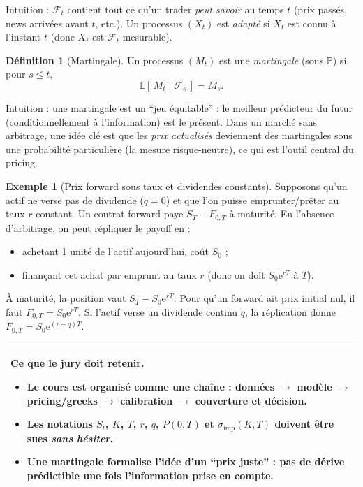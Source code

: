 \documentclass[11pt,a4paper]{report}
\newcommand{\ee}{\mathrm{e}}
\newcommand{\E}{\mathbb{E}}
\newcommand{\Prob}{\mathbb{P}}
\newcommand{\1}{\mathbbm{1}}
\newcommand{\F}{\mathcal{F}}
\newcommand{\bracket}[1]{\left[#1\right]}
\theoremstyle{definition}
\newtheorem{definition}{Définition}[chapter]
\newtheorem{example}{Exemple}[chapter]
\theoremstyle{plain}
\theoremstyle{remark}
\newenvironment{jurybox}{%
  \begin{center}
  \setlength{\tabcolsep}{6pt}%
  \renewcommand{\arraystretch}{1.1}%
  \begin{tabular}{|p{0.94\textwidth}|}
  \hline
  \small\textbf{Ce que le jury doit retenir.}\par\medskip
}{%
  \\ \hline
  \end{tabular}
  \end{center}
}
\begin{document}
Intuition : $\F_t$ contient tout ce qu'un trader \emph{peut savoir} au temps $t$ (prix passés, news arrivées avant $t$, etc.).
Un processus $(X_t)$ est \emph{adapté} si $X_t$ est connu à l'instant $t$ (donc $X_t$ est $\F_t$-mesurable).

\begin{definition}[Martingale]
Un processus $(M_t)$ est une \emph{martingale} (sous $\Prob$) si, pour $s\le t$,
\[
\E\bracket{\,M_t\mid \F_s\,}=M_s.
\]
\end{definition}

Intuition : une martingale est un ``jeu équitable'' : le meilleur prédicteur du futur (conditionnellement à l'information) est le présent.
Dans un marché sans arbitrage, une idée clé est que les \emph{prix actualisés} deviennent des martingales sous une probabilité particulière (la mesure risque-neutre), ce qui est l'outil central du pricing.

\begin{example}[Prix forward sous taux et dividendes constants]
Supposons qu'un actif ne verse pas de dividende ($q=0$) et que l'on puisse emprunter/prêter au taux $r$ constant.
Un contrat forward paye $S_T - F_{0,T}$ à maturité.
En l'absence d'arbitrage, on peut répliquer le payoff en :
\begin{itemize}
\item achetant 1 unité de l'actif aujourd'hui, coût $S_0$ ;
\item finançant cet achat par emprunt au taux $r$ (donc on doit $S_0\ee^{rT}$ à $T$).
\end{itemize}
À maturité, la position vaut $S_T - S_0\ee^{rT}$.
Pour qu'un forward ait prix initial nul, il faut $F_{0,T}=S_0\ee^{rT}$.
Si l'actif verse un dividende continu $q$, la réplication donne $F_{0,T}=S_0\ee^{(r-q)T}$.
\end{example}

\begin{jurybox}
\begin{itemize}
\item Le cours est organisé comme une chaîne : données $\rightarrow$ modèle $\rightarrow$ pricing/greeks $\rightarrow$ calibration $\rightarrow$ couverture et décision.
\item Les notations $S_t$, $K$, $T$, $r$, $q$, $P(0,T)$ et $\sigma_{\mathrm{imp}}(K,T)$ doivent être sues \emph{sans hésiter}.
\item Une martingale formalise l'idée d'un ``prix juste'' : pas de dérive prédictible une fois l'information prise en compte.
\end{itemize}
\end{jurybox}
\end{document}
